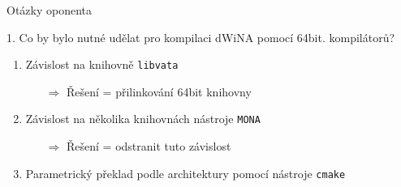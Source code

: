 \documentclass{beamer}
\begin{document}
\appendix
{}
\setcounter{finalframe}{\value{framenumber}}

	\begin{frame}{Otázky oponenta}
	\begin{block}{1. Co by bylo nutné udělat pro kompilaci dWiNA pomocí 64bit. kompilátorů?}
	\begin{center}
	\begin{enumerate}
	 \item Závislost na knihovně \texttt{libvata}
	\pause
	 \begin{itemize}
	  \item[$\Rightarrow$] Řešení = přilinkování 64bit knihovny
	 \end{itemize}
	\pause
	 \item Závislost na několika knihovnách nástroje \texttt{MONA}
	\pause
	 	 \begin{itemize}
	  \item[$\Rightarrow$] Řešení = odstranit tuto závislost
	 \end{itemize}
	\pause
	\item Parametrický překlad podle architektury pomocí nástroje \texttt{cmake}
	\pause
	\end{enumerate}
	\end{center}
	\end{block}
	\end{frame}

\setcounter{framenumber}{\value{finalframe}}
\end{document}
